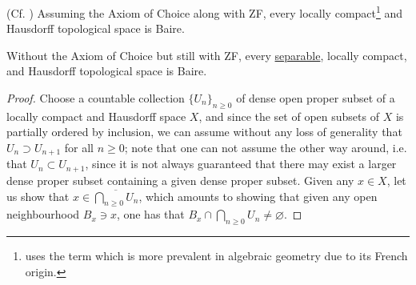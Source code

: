         \begin{theorem} \label{theorem: baire_category}
            (Cf. \cite[\href{https://stacks.math.columbia.edu/tag/0CQN}{Tag 0CQN}]{stacks}) Assuming the Axiom of Choice along with ZF, every locally compact\footnote{\cite{stacks} uses the term  which is more prevalent in algebraic geometry due to its French origin.} and Hausdorff topological space is Baire.
            
            Without the Axiom of Choice but still with ZF, every \underline{separable}, locally compact, and Hausdorff topological space is Baire.
        \end{theorem}
            \begin{proof}
                Choose a countable collection $\{U_n\}_{n \geq 0}$ of dense open proper subset of a locally compact and Hausdorff space $X$, and since the set of open subsets of $X$ is partially ordered by inclusion, we can assume without any loss of generality that $U_n \supset U_{n + 1}$ for all $n \geq 0$; note that one can not assume the other way around, i.e. that $U_n \subset U_{n + 1}$, since it is not always guaranteed that there may exist a larger dense proper subset containing a given dense proper subset. Given any $x \in X$, let us show that $x \in \overline{\bigcap_{n \geq 0} U_n}$, which amounts to showing that given any open neighbourhood $B_x \ni x$, one has that $B_x \cap \bigcap_{n \geq 0} U_n \not = \varnothing$. 
                

\end{proof}
